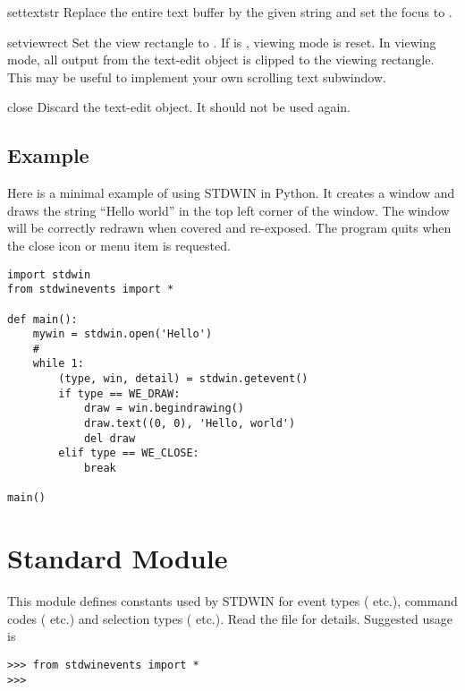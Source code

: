 \begin{funcdesc}{settext}{str}
Replace the entire text buffer by the given string and set the focus
to .
\end{funcdesc}

\begin{funcdesc}{setview}{rect}
Set the view rectangle to .  If  is ,
viewing mode is reset.  In viewing mode, all output from the text-edit
object is clipped to the viewing rectangle.  This may be useful to
implement your own scrolling text subwindow.
\end{funcdesc}

\begin{funcdesc}{close}{}
Discard the text-edit object.  It should not be used again.
\end{funcdesc}

\subsection{Example}

Here is a minimal example of using STDWIN in Python.
It creates a window and draws the string ``Hello world'' in the top
left corner of the window.
The window will be correctly redrawn when covered and re-exposed.
The program quits when the close icon or menu item is requested.

\bcode\begin{verbatim}
import stdwin
from stdwinevents import *

def main():
    mywin = stdwin.open('Hello')
    #
    while 1:
        (type, win, detail) = stdwin.getevent()
        if type == WE_DRAW:
            draw = win.begindrawing()
            draw.text((0, 0), 'Hello, world')
            del draw
        elif type == WE_CLOSE:
            break

main()
\end{verbatim}\ecode

\section{Standard Module }

This module defines constants used by STDWIN for event types
( etc.), command codes ( etc.)
and selection types ( etc.).
Read the file for details.
Suggested usage is

\bcode\begin{verbatim}
>>> from stdwinevents import *
>>> 
\end{verbatim}\ecode

